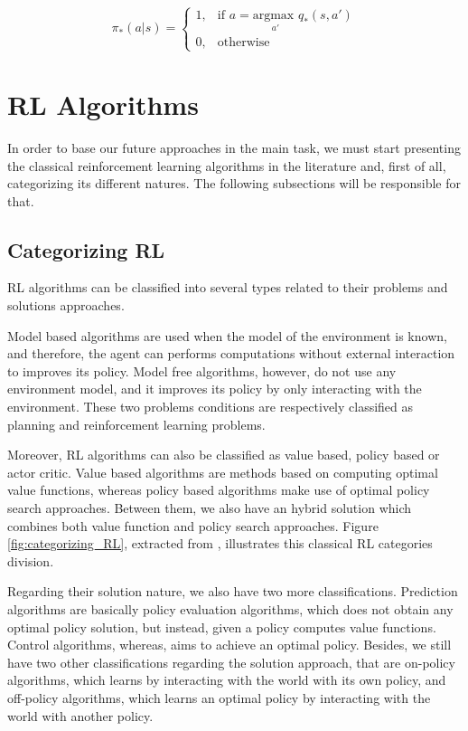 \begin{equation}
 \pi_*(a | s) = 
\begin{cases}
    1,& \text{if } a = \underset{a'}{\textrm{argmax }} q_*(s,a')\\
    0,& \text{otherwise}
\end{cases}
\label{eq:policy_from_greedy}
\end{equation}

\section{RL Algorithms}

In order to base our future approaches in the main task, we must start presenting the classical reinforcement learning algorithms in the literature and, first of all, categorizing its different natures. The following subsections will be responsible for that.

\subsection{Categorizing RL}

RL algorithms can be classified into several types related to their problems and solutions approaches.


Model based algorithms are used when the model of the environment is known, and therefore, the agent can performs computations without external interaction to improves its policy. Model free algorithms, however, do not use any environment model, and it improves its policy by only interacting with the environment. These two problems conditions are respectively classified as planning and reinforcement learning problems.

Moreover, RL algorithms can also be classified as value based, policy based or actor critic. Value based algorithms are methods based on computing optimal value functions, whereas policy based algorithms make use of optimal policy search approaches. Between them, we also have an hybrid solution which combines both value function and policy search approaches. Figure \ref{fig:categorizing_RL}, extracted from \cite{lecture1DS}, illustrates this classical RL categories division.

Regarding their solution nature, we also have two more classifications. Prediction algorithms are basically policy evaluation algorithms, which does not obtain any optimal policy solution, but instead, given a policy computes value functions. Control algorithms, whereas, aims to achieve an optimal policy. Besides, we still have two other classifications regarding the solution approach, that are on-policy algorithms, which learns by interacting with the world with its own policy, and off-policy algorithms, which learns an optimal policy by interacting with the world with another policy.

